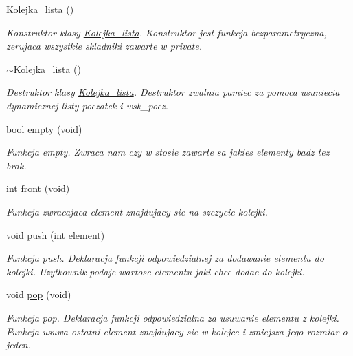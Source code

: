 \begin{DoxyCompactItemize}
\item 
\hyperlink{class_kolejka__lista_a7208c60729540ca7b9099987dda7bc7b}{\-Kolejka\-\_\-lista} ()
\begin{DoxyCompactList}\small\item\em \-Konstruktor klasy \hyperlink{class_kolejka__lista}{\-Kolejka\-\_\-lista}. \-Konstruktor jest funkcja bezparametryczna, zerujaca wszystkie skladniki zawarte w private. \end{DoxyCompactList}\item 
\hyperlink{class_kolejka__lista_af84680ce033e41ef9688e432a0934fa9}{$\sim$\-Kolejka\-\_\-lista} ()
\begin{DoxyCompactList}\small\item\em \-Destruktor klasy \hyperlink{class_kolejka__lista}{\-Kolejka\-\_\-lista}. \-Destruktor zwalnia pamiec za pomoca usuniecia dynamicznej listy poczatek i wsk\-\_\-pocz. \end{DoxyCompactList}\item 
bool \hyperlink{class_kolejka__lista_a4837bfca938aa2b6f017e2095af530e7}{empty} (void)
\begin{DoxyCompactList}\small\item\em \-Funkcja empty. \-Zwraca nam czy w stosie zawarte sa jakies elementy badz tez brak. \end{DoxyCompactList}\item 
int \hyperlink{class_kolejka__lista_ac02c779e92932408ac9c8c8d964153c5}{front} (void)
\begin{DoxyCompactList}\small\item\em \-Funkcja zwracajaca element znajdujacy sie na szczycie kolejki. \end{DoxyCompactList}\item 
void \hyperlink{class_kolejka__lista_a96c9087072efa9b2787c4e2344ed88f9}{push} (int element)
\begin{DoxyCompactList}\small\item\em \-Funkcja push. \-Deklaracja funkcji odpowiedzialnej za dodawanie elementu do kolejki. \-Uzytkownik podaje wartosc elementu jaki chce dodac do kolejki. \end{DoxyCompactList}\item 
void \hyperlink{class_kolejka__lista_ac3014e11247bd54f79c9ac16581b547e}{pop} (void)
\begin{DoxyCompactList}\small\item\em \-Funkcja pop. \-Deklaracja funkcji odpowiedzialna za usuwanie elementu z kolejki. \-Funkcja usuwa ostatni element znajdujacy sie w kolejce i zmiejsza jego rozmiar o jeden. \end{DoxyCompactList}\item 

\end{DoxyCompactItemize}
